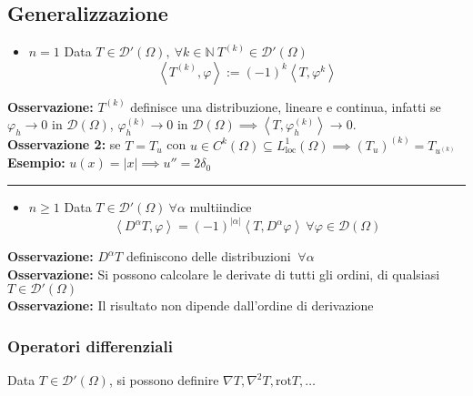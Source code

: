 \documentclass[a4paper]{article}
\newcommand{\N}{\mathbb{N}}
\newcommand{\divider}{\noindent\rule{\textwidth}{0.5pt}}
\begin{document}
\subsection{Generalizzazione }
\begin{itemize}
	\item $n=1$ Data $T\in \mathcal D'(\Omega),\ \forall k\in \N\ T^{(k)}\in \mathcal D'(\Omega)$
		\[\left<T^{(k)},\varphi \right>:= (-1)^k\left<T,\varphi^{k} \right>  \]
\end{itemize}
\textbf{Osservazione:} $T^{(k)}$ definisce una distribuzione, lineare e continua, infatti se $\varphi_h\to 0\text{ in }\mathcal D(\Omega)$, $\varphi_h^{(k)}\to 0\text{ in }\mathcal D(\Omega)\implies \left<T,\varphi_h^{(k)} \right> \to 0$.\\
\textbf{Osservazione 2:} se $T=T_u$ con $u\in C^k(\Omega)\subseteq  L^1_{\text{loc}}(\Omega)\implies (T_u)^{\left( k \right) }=T_{u^{(k)}}$\\
\textbf{Esempio: }$u(x)=|x|\implies u''=2\delta_0$
\\\divider
\begin{itemize}
	\item $n\ge 1$ Data $T\in \mathcal D'(\Omega)\ \forall \alpha$ multiindice 
		\[\left<D^\alpha T,\varphi \right> =(-1)^{|\alpha|}\left<T,D^{\alpha}\varphi \right> \ \forall \varphi\in \mathcal D(\Omega)\]

\end{itemize}
\textbf{Osservazione: }$D^\alpha T$ definiscono delle distribuzioni $\ \forall \alpha$ 
\\\textbf{Osservazione: }Si possono calcolare le derivate di tutti gli ordini, di qualsiasi $T\in \mathcal D'(\Omega)$ 
\\\textbf{Osservazione:} Il risultato non dipende dall'ordine di derivazione
\subsubsection{Operatori differenziali}
Data $T\in \mathcal D'(\Omega)$, si possono definire $\nabla T,\nabla^2 T,\text{rot}T,\ldots$ 
\end{document}
